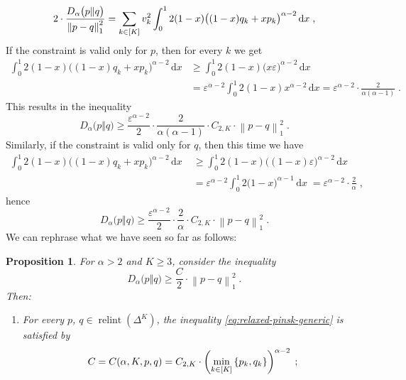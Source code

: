 \documentclass[11pt,oneside,a4paper]{article}
\newcommand{\e}{\varepsilon}
\newcommand{\lrb}[1]{\left(#1\right)}
\newcommand{\brb}[1]{\bigl(#1\bigr)}
\newcommand{\lcb}[1]{\left\{#1\right\}}
\newcommand{\lno}[1]{\left\lVert#1\right\rVert}
\newcommand{\diff}{\,\mathrm{d}}
\theoremstyle{plain}
\newtheorem{proposition}[theorem]{Proposition}
\theoremstyle{definition}
\theoremstyle{remark}
\newcommand{\simplex}[1]{\Delta^{#1}}
\DeclareMathOperator*{\relint}{relint}
\begin{document}
{\begin{equation}\notag
    2\cdot \frac{D_\alpha\brb{p\Vert q}}{\lno{p - q}_1^2}
=
    \sum_{k \in [K]} v_k^2 \int_0^1 2(1-x) \brb{(1-x)q_k+xp_k}^{\alpha-2} \diff x\;,
\end{equation}
If the constraint is valid only for $p$, then for every $k$ we get
\begin{align*}    
    \int_0^1 2(1-x) \brb{(1-x)q_k+xp_k}^{\alpha-2} \diff x
&\ge
    \int_0^1 2(1-x) \brb{x\e}^{\alpha-2} \diff x
\\
&=
    \e^{\alpha - 2} \int_0^1 2(1-x)x^{\alpha-2} \diff x
=
    {\e}^{\alpha - 2} \cdot \frac{2}{\alpha (\alpha - 1)}\;.
\end{align*}
This results in the inequality
\begin{equation}\label{eq:relaxed-pinsk-p-constraint}
    D_\alpha\brb{p\Vert q}
\ge
    \frac{\e^{\alpha - 2}}{2}
\cdot
     \frac{2}{\alpha (\alpha - 1)}
\cdot
    C_{2, K}
\cdot
    {\lno{p - q}_1^2}\;.
\end{equation}
Similarly, if the constraint is valid only for $q$, then this time we have
\begin{align*}   
    \int_0^1 2(1-x) \brb{(1-x)q_k+xp_k}^{\alpha-2} \diff x\;
&\ge
    \int_0^1 2(1-x) \brb{(1-x)\e }^{\alpha-2} \diff x\;
\\
&=
    \e^{\alpha - 2} \int_0^1 2\brb{1-x}^{\alpha-1} \diff x\;
=
    \e^{\alpha - 2} \cdot \frac{2}{\alpha}\;,
\end{align*}    
hence
\begin{equation}\label{eq:relaxed-pinsk-q-constraint}
    D_\alpha\brb{p\Vert q}
\ge
    \frac{\e^{\alpha - 2}}{2}
\cdot
     \frac{2}{\alpha}
\cdot
    C_{2, K}
\cdot
    {\lno{p - q}_1^2}\;.
\end{equation}
We can rephrase what we have seen so far as follows: 
\begin{proposition}
    For $\alpha > 2$ and $K \geq 3$, consider the inequality
\begin{equation}\label{eq:relaxed-pinsk-generic}
    D_\alpha\brb{p\Vert q}
\ge
    \frac{C}{2}
\cdot
    {\lno{p - q}_1^2}\;.
\end{equation}
Then:
\begin{enumerate}
    \item For every $p$, $q \in \relint{\lrb{\simplex{K}}}$, the inequality \eqref{eq:relaxed-pinsk-generic} is satisfied by 
    \begin{equation}\notag
        C 
    =
        C(\alpha, K, p, q) 
    =  
        C_{2, K} 
    \cdot
        \lrb{\min_{k \in [K]}\lcb{p_k, q_k}}^{\alpha - 2}\;;

\end{equation}
\end{enumerate}
\end{proposition}}
\end{document}
